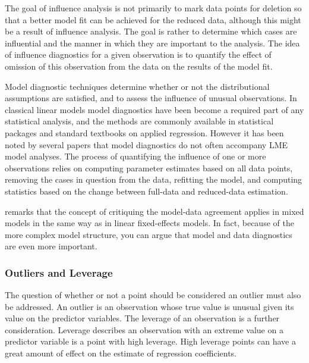 \documentclass[12pt, a4paper]{report}
\theoremstyle{plain}
\theoremstyle{definition}
\theoremstyle{remark}
\begin{document}
		
	The goal of influence analysis is not primarily to mark data
	points for deletion so that a better model fit can be achieved for the reduced data, although this might be a
	result of influence analysis. The goal is rather to determine which cases are influential and the manner in
	which they are important to the analysis. The idea of influence diagnostics for a given observation is to quantify the effect of omission of this observation
	from the data on the results of the model fit. %
	
	Model diagnostic techniques determine whether or not the distributional assumptions are satisfied, and to assess the influence of unusual observations. In classical linear models model diagnostics have been become a required part of any statistical analysis, and the methods are commonly available in statistical packages and standard textbooks on applied regression. However it has been noted by several papers that model diagnostics do not often accompany LME model analyses.
	The process of quantifying the influence of one or more observations relies on computing parameter estimates based on all data points, removing the cases in question from the data, refitting the model, and computing statistics based on the change between full-data and reduced-data estimation.
	
	
	\citet{schabenberger} remarks that the concept of critiquing the model-data agreement applies in mixed models in the same way as in linear
	fixed-effects models. In fact, because of the more complex model structure, you can argue that model and
	data diagnostics are even more important.

	

	\subsubsection{Outliers and Leverage}
	
	
	
	The question of whether or not a point should be considered an outlier must also be addressed. An outlier is an observation whose true value is unusual given its value on the predictor variables. The leverage of an observation is a further consideration. Leverage describes an observation with an extreme value on a predictor variable is a point with high leverage. High leverage points can have a great amount of effect on the estimate of regression coefficients.
	
\end{document}
